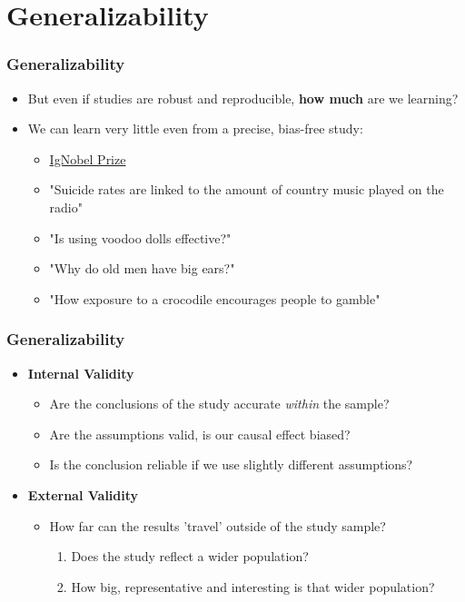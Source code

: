 \documentclass[xcolor=x11names,compress]{beamer}\usepackage[]{graphicx}\usepackage[]{xcolor}
\renewcommand{\(}{\begin{columns}}
\renewcommand{\)}{\end{columns}}
\newcommand{\<}[1]{\begin{column}{#1}}
\renewcommand{\>}{\end{column}}
\begin{document}
\section{Generalizability}

\begin{frame}
\frametitle{Generalizability}
\begin{itemize}
\item But even if studies are robust and reproducible, \textbf{how much} are we learning?
\pause
\item We can learn very little even from a precise, bias-free study:
\pause
\begin{itemize}
\item \href{https://www.improbable.com/ig/winners}{IgNobel Prize}
\item "Suicide rates are linked to the amount of country music played on the radio"
\item "Is using voodoo dolls effective?"
\item "Why do old men have big ears?"
\item "How exposure to a crocodile encourages people to gamble"
\end{itemize}
\end{itemize}
\end{frame}

\begin{frame}
\frametitle{Generalizability}
\begin{itemize}
\item \textbf{Internal Validity}
\begin{itemize}
\item Are the conclusions of the study accurate \textit{within} the sample?
\pause
\item Are the assumptions valid, is our causal effect biased?
\pause
\item Is the conclusion reliable if we use slightly different assumptions?
\pause
\end{itemize}
\item \textbf{External Validity}
\begin{itemize}
\item How far can the results 'travel' outside of the study sample?
\pause
\begin{enumerate}
\item Does the study reflect a wider population?
\pause
\item How big, representative and interesting is that wider population?
\end{enumerate}
\end{itemize}
\end{itemize}
\end{frame}
\end{document}
